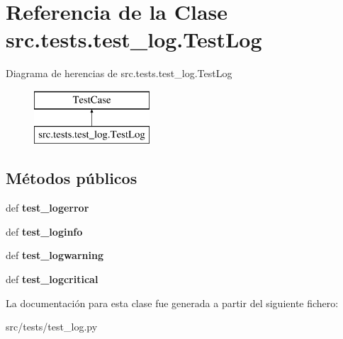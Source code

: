 \hypertarget{classsrc_1_1tests_1_1test__log_1_1_test_log}{\section{Referencia de la Clase src.\-tests.\-test\-\_\-log.\-Test\-Log}
\label{classsrc_1_1tests_1_1test__log_1_1_test_log}
}
Diagrama de herencias de src.\-tests.\-test\-\_\-log.\-Test\-Log\begin{figure}[H]
\begin{center}
\leavevmode
\includegraphics[height=2.000000cm]{classsrc_1_1tests_1_1test__log_1_1_test_log}
\end{center}
\end{figure}
\subsection*{Métodos públicos}
\begin{DoxyCompactItemize}
\item 
\hypertarget{classsrc_1_1tests_1_1test__log_1_1_test_log_a1b2d6f8ea4a314b5545a62fd73c5aa69}{def {\bfseries test\-\_\-logerror}}\label{classsrc_1_1tests_1_1test__log_1_1_test_log_a1b2d6f8ea4a314b5545a62fd73c5aa69}

\item 
\hypertarget{classsrc_1_1tests_1_1test__log_1_1_test_log_a55badfe4636912857e0fba75c47a24f7}{def {\bfseries test\-\_\-loginfo}}\label{classsrc_1_1tests_1_1test__log_1_1_test_log_a55badfe4636912857e0fba75c47a24f7}

\item 
\hypertarget{classsrc_1_1tests_1_1test__log_1_1_test_log_a0cc72389e7c73f881290028363e5e635}{def {\bfseries test\-\_\-logwarning}}\label{classsrc_1_1tests_1_1test__log_1_1_test_log_a0cc72389e7c73f881290028363e5e635}

\item 
\hypertarget{classsrc_1_1tests_1_1test__log_1_1_test_log_acd93374668bc2a31d7ecc095ed838b3f}{def {\bfseries test\-\_\-logcritical}}\label{classsrc_1_1tests_1_1test__log_1_1_test_log_acd93374668bc2a31d7ecc095ed838b3f}

\end{DoxyCompactItemize}


La documentación para esta clase fue generada a partir del siguiente fichero\-:\begin{DoxyCompactItemize}
\item 
src/tests/test\-\_\-log.\-py\end{DoxyCompactItemize}
